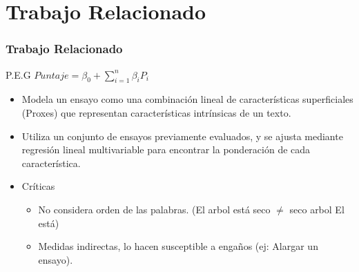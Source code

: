 \documentclass{beamer}
\begin{document}
\section{Trabajo Relacionado}
\begin{frame}
\frametitle{Trabajo Relacionado}

\begin{block}{P.E.G}
$Puntaje = \beta_0 + \sum_{i=1}^{n}\beta_i P_i$
\end{block}

\begin{itemize}
\item Modela un ensayo como una combinación lineal de características superficiales (Proxes) que representan características intrínsicas de un texto.
\item Utiliza un conjunto de ensayos previamente evaluados, y se ajusta mediante regresión lineal multivariable para encontrar la ponderación de cada característica.

\item Críticas
\begin{itemize}
\item No considera orden de las palabras. (El arbol está seco $\neq$ seco arbol El está)
\item Medidas indirectas, lo hacen susceptible a engaños (ej: Alargar un ensayo).
\end{itemize}

\end{itemize}

\end{frame}

\end{document}
